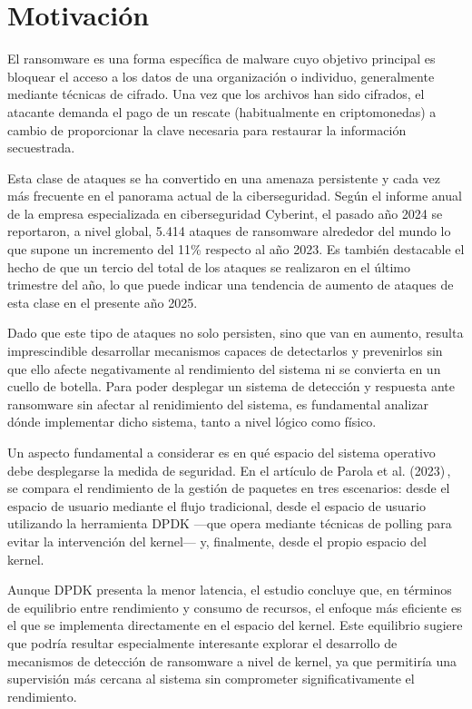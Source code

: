 \section{Motivación}
El ransomware es una forma específica de malware cuyo objetivo principal es bloquear el acceso a los datos de una organización o individuo, generalmente mediante técnicas de cifrado. Una vez que los archivos han sido cifrados, el atacante demanda el pago de un rescate (habitualmente en criptomonedas) a cambio de proporcionar la clave necesaria para restaurar la información secuestrada\cite{NISTransomware2023}.

Esta clase de ataques se ha convertido en una amenaza persistente y cada vez más frecuente en el panorama actual de la ciberseguridad. Según el informe anual de la empresa especializada en ciberseguridad Cyberint\cite{Bleih2025}, el pasado año 2024 se reportaron, a nivel global, 5.414 ataques de ransomware alrededor del mundo lo que supone un incremento del 11\% respecto al año 2023. Es también destacable el hecho de que un tercio del total de los ataques se realizaron en el último trimestre del año, lo que puede indicar una tendencia de aumento de ataques de esta clase en el presente año 2025.

Dado que este tipo de ataques no solo persisten, sino que van en aumento, resulta imprescindible desarrollar mecanismos capaces de detectarlos y prevenirlos sin que ello afecte negativamente al rendimiento del sistema ni se convierta en un cuello de botella. Para poder desplegar un sistema de detección y respuesta ante ransomware sin afectar al renidimiento del sistema, es fundamental analizar dónde implementar dicho sistema, tanto a nivel lógico como físico.

Un aspecto fundamental a considerar es en qué espacio del sistema operativo debe desplegarse la medida de seguridad. En el artículo de Parola et al. (2023) \cite{Parola2023}, se compara el rendimiento de la gestión de paquetes en tres escenarios: desde el espacio de usuario mediante el flujo tradicional, desde el espacio de usuario utilizando la herramienta DPDK —que opera mediante técnicas de polling para evitar la intervención del kernel— y, finalmente, desde el propio espacio del kernel.

Aunque DPDK presenta la menor latencia, el estudio concluye que, en términos de equilibrio entre rendimiento y consumo de recursos, el enfoque más eficiente es el que se implementa directamente en el espacio del kernel. Este equilibrio sugiere que podría resultar especialmente interesante explorar el desarrollo de mecanismos de detección de ransomware a nivel de kernel, ya que permitiría una supervisión más cercana al sistema sin comprometer significativamente el rendimiento.

